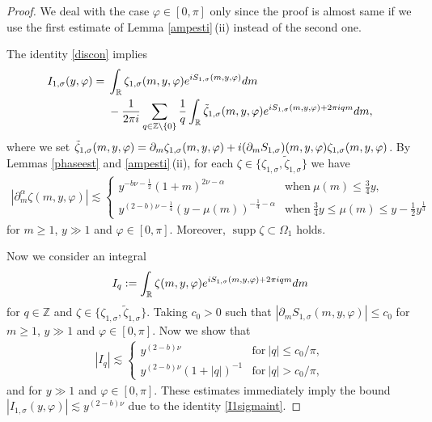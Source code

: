 \documentclass[10pt,a4paper]{article}
\numberwithin{equation}{section}
\def\R{\mathbb{R}}%
\DeclareMathOperator{\supp}{supp}%
\def\a{\alpha}
\def\f{\varphi}
\def\m{\mu}
\def\n{\nu}
\def\s{\sigma}
\def\z{\zeta}
\def\pa{\partial}
\begin{document}
\begin{proof}
We deal with the case $\f\in [0,\pi]$ only since the proof is almost same if we use the first estimate of Lemma \ref{ampesti}\,(ii) instead of the second one.

The identity \eqref{discon} implies
\begin{align}
I_{1,\s}(y,\f)={}&\int_{\R}\z_{1,\s}(m,y,\f){\rm e}^{{\rm i}S_{1,\s}(m,y,\f)}{\rm d}m\nonumber\\
&-\frac{1}{2\pi {\rm i}}\sum_{q\in\mathbb{Z}\setminus \{0\}}\frac{1}{q}\int_{\R}\tilde{\z}_{1,\s}(m,y,\f){\rm e}^{{\rm i}S_{1,\s}(m,y,\f)+2\pi {\rm i}qm}{\rm d}m,\label{I1sigmaint}
\end{align}
where we set
$
\tilde{\z}_{1,\s}(m,y,\f)=\pa_m\z_{1,\s}(m,y,\f)+{\rm i}(\pa_mS_{1,\s})(m,y,\f)\z_{1,\s}(m,y,\f)$.
By Lemmas \ref{phaseest} and \ref{ampesti}\,(ii), for each $\z\in \big\{\z_{1,\s},\tilde{\z}_{1,\s}\big\}$ we have
\begin{align}\label{sevzetaest}
|\pa_{m}^{\a}\z(m,y,\f)|\lesssim \begin{cases} y^{-b\n-\frac{1}{2}}(1+m)^{2\n-\a} & \text{when}\  \m(m)\leq \frac{3}{4}y, \\
y^{(2-b)\n-\frac{1}{4}} (y-\m(m))^{-\frac{1}{4}-\a}& \text{when}\  \frac{3}{4}y\leq \m(m)\leq y-\frac{1}{2}y^{\frac{1}{3}}
\end{cases}
\end{align}
for $m\geq 1$, $y\gg1$ and $\f\in [0,\pi]$. Moreover, $\supp \z\subset \Omega_1$ holds.

Now we consider an integral
\[%
I_q:=\int_{\R}\z(m,y,\f){\rm e}^{{\rm i}S_{1,\s}(m,y,\f)+2\pi {\rm i}qm}{\rm d}m
\]
for $q\in\mathbb{Z}$ and $\z\in \{\z_{1,\s},\tilde{\z}_{1,\s}\}$. Taking $c_0>0$ such that $|\pa_mS_{1,\s}(m,y,\f)|\leq c_0$ for $m\geq 1$, $y\gg 1$ and $\f\in [0,\pi]$. Now we show that
\begin{align*}%
|I_q|\lesssim \begin{cases}
y^{(2-b)\n} & \text{for}\  |q|\leq c_0/\pi,\\
y^{(2-b)\n}(1+|q|)^{-1}& \text{for}\  |q|> c_0/\pi,
\end{cases}
\end{align*}
and for $y\gg 1$ and $\f\in [0,\pi]$.
These estimates immediately imply the bound $|I_{1,\s}(y,\f)|\lesssim y^{(2-b)\n}$ due to the identity \eqref{I1sigmaint}.


\end{proof}
\end{document}
